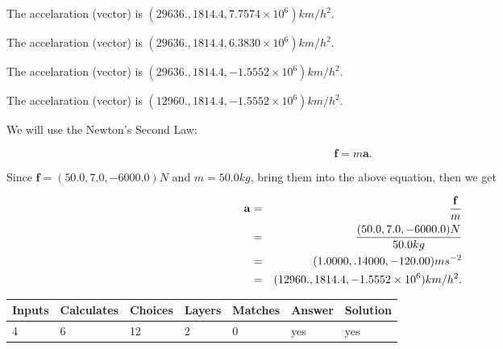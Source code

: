 \documentclass[12pt]{article}
\begin{document}
 
The accelaration (vector) is
$(
29636.,
1814.4 ,
7.7574 \times 10^{6}
)km/h^2.
$
 
 
The accelaration (vector) is
$(
29636.,
1814.4 ,
6.3830 \times 10^{6}
)km/h^2.
$
 
 
The accelaration (vector) is
$(
29636.,
1814.4 ,
-1.5552 \times 10^{6}
)km/h^2.
$
 
 
\noindent{}
 
 
The accelaration (vector) is
$(
12960.,
1814.4 ,
-1.5552 \times 10^{6}
)km/h^2.
$
 
 
\noindent{}
 
 
 
 
 
 
\noindent{}
 
 

We will use the Newton's Second Law:
 
\[
\mathbf{f}=m\mathbf{a}.
\]
 
Since $\mathbf{f}=( %
50.0,  %
7.0,  %
-6000.0 )N$
and $m= %
50.0 kg$, bring them into the above equation, then we get
 
\begin{eqnarray*}
\mathbf{a}&=&\frac{\mathbf{f}}m  \\
&=&\frac{(
50.0 ,
7.0 ,
-6000.0 )N
}{ %
50.0 kg}  \\
&=&(
1.0000 ,
.14000,
-120.00
)ms^{-2} \\
&=&(
12960. ,
1814.4 ,
-1.5552 \times 10^{6}
)km/h^2.
\end{eqnarray*}
 
 
 
\noindent{}
 
 

 
 
\vspace{0.3in}
   
   
   
   
\noindent\begin{tabular}{|l|l|l|l|l|l|l|}
 \hline
Inputs & Calculates & Choices & Layers & Matches & Answer & Solution \\ \hline
           4 & 
           6 & 
          12
  & 
           2 & 
           0 & 
  yes & 
  yes 
  \\ \hline
 \end{tabular}
   
\end{document}
